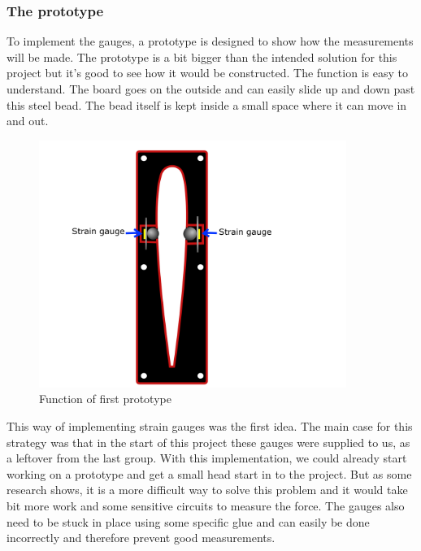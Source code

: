 
\subsubsection{The prototype}%
To implement the gauges, a prototype is designed to show how the measurements will be made. The prototype is a bit bigger than the intended solution for this project but it's good to see how it would be constructed. The function is easy to understand. The board goes on the outside and can easily slide up and down past this steel bead. The bead itself is kept inside a small space where it can move in and out.
 
\begin{figure}[H]%
\begin{center}
	\includegraphics[width = 10cm]{Figures/Prototyp_1.png}
	\caption{Function of first prototype}
	\label{Press_sens_prot_1}
\end{center}
\end{figure}

This way of implementing strain gauges was the first idea. 
The main case for this strategy was that in the start of this project these gauges were supplied to us, as a leftover from the last group. With this implementation, we could already start working on a prototype and get a small head start in to the project. But as some research shows, it is a more difficult way to solve this problem and it would take bit more work and some sensitive circuits to measure the force. The gauges also need to be stuck in place using some specific glue and can easily be done incorrectly and therefore prevent good measurements.

